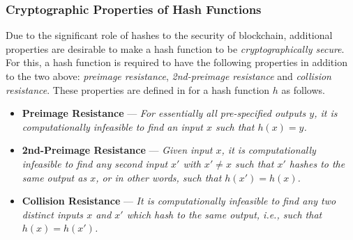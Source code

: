 \subsubsection{Cryptographic Properties of Hash Functions}

Due to the significant role of hashes to the security of blockchain, additional properties are desirable to make a hash function to be \textit{cryptographically secure}. For this, a hash function is required to have the following properties in addition to the two above: \textit{preimage resistance}, \textit{2nd-preimage resistance} and \textit{collision resistance}. These properties are defined in \cite{menezes1997handbook} for a hash function $h$ as follows.

\begin{itemize}
    \item \textbf{Preimage Resistance} --- \textit{For essentially all pre-specified outputs $y$, it is computationally infeasible to find an input $x$ such that $h(x) = y$.}
    \item \textbf{2nd-Preimage Resistance} --- \textit{Given input $x$, it is computationally infeasible to find any second input $x'$ with $x' \neq x$ such that $x'$ hashes to the same output as $x$, or in other words, such that $h(x') = h(x)$.}
    \item \textbf{Collision Resistance} --- \textit{It is computationally infeasible to find any two distinct inputs $x$ and $x'$ which hash to the same output, i.e., such that $h(x) = h(x')$.} 
\end{itemize}

